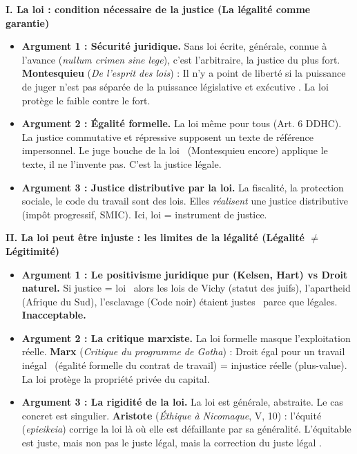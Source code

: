 \documentclass[11pt]{article}
\newcommand{\cle}[1]{{\popxbold\color{popdark}#1}}
\begin{document}
\begin{exoresolu}
\textbf{I. La loi : condition nécessaire de la justice (La légalité comme garantie)}
\begin{itemize}
    \item \textbf{Argument 1 : Sécurité juridique.} Sans loi écrite, générale, connue à l'avance (\emph{nullum crimen sine lege}), c'est l'arbitraire, la justice du plus fort. \textbf{Montesquieu} (\emph{De l'esprit des lois}) : \guillemotleft Il n'y a point de liberté si la puissance de juger n'est pas séparée de la puissance législative et exécutive \guillemotright. La loi protège le faible contre le fort.
    \item \textbf{Argument 2 : Égalité formelle.} La loi même pour tous (Art. 6 DDHC). La justice commutative et répressive supposent un texte de référence impersonnel. Le juge \guillemotleft bouche de la loi \guillemotright\ (Montesquieu encore) applique le texte, il ne l'invente pas. C'est la \cle{justice légale}.
    \item \textbf{Argument 3 : Justice distributive par la loi.} La fiscalité, la protection sociale, le code du travail sont des lois. Elles \emph{réalisent} une justice distributive (impôt progressif, SMIC). Ici, loi = instrument de justice.
\end{itemize}

\textbf{II. La loi peut être injuste : les limites de la légalité (Légalité $\neq$ Légitimité)}
\begin{itemize}
    \item \textbf{Argument 1 : Le positivisme juridique pur (Kelsen, Hart) vs Droit naturel.} Si \guillemotleft justice = loi \guillemotright\, alors les lois de Vichy (statut des juifs), l'apartheid (Afrique du Sud), l'esclavage (Code noir) étaient \guillemotleft justes \guillemotright\ parce que légales. \textbf{Inacceptable.}
    \item \textbf{Argument 2 : La critique marxiste.} La loi formelle masque l'exploitation réelle. \textbf{Marx} (\emph{Critique du programme de Gotha}) : \guillemotleft Droit égal pour un travail inégal \guillemotright\ (égalité formelle du contrat de travail) = injustice réelle (plus-value). La loi protège la propriété privée du capital.
    \item \textbf{Argument 3 : La rigidité de la loi.} La loi est générale, abstraite. Le cas concret est singulier. \textbf{Aristote} (\emph{Éthique à Nicomaque}, V, 10) : l'\cle{équité} (\emph{epieikeia}) corrige la loi là où elle est défaillante par sa généralité. \guillemotleft L'équitable est juste, mais non pas le juste légal, mais la correction du juste légal \guillemotright.
\end{itemize}


\end{exoresolu}
\end{document}
